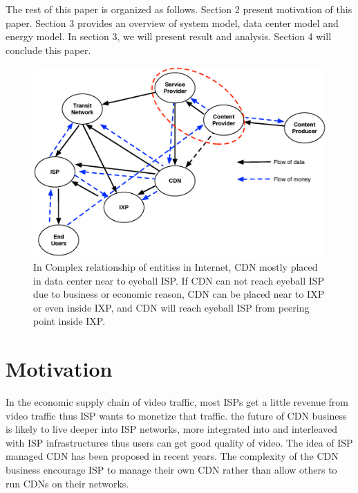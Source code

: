 \documentclass[JIP]{ipsj}
\begin{document}
The rest of this paper is organized as follows. 
Section 2 present motivation of this paper.
Section 3 provides an overview of system model, data center model and energy model.  
In section 3, we will present result and analysis.  
Section 4 will conclude this paper. 

\begin{figure}[tb]
\begin{center}
\includegraphics[scale=0.4]{graphs/business-relationship.eps}
\end{center}
\caption{In Complex relationship of entities in Internet, 
CDN mostly placed in data center near to eyeball ISP. 
If CDN can not reach eyeball ISP due to business or economic reason, CDN can be placed near to IXP or even inside IXP, and CDN will reach eyeball ISP from peering point inside IXP.}
\label{fig:businessrelationship}
\end{figure} 

\section{Motivation}\label{motivation}
In the economic supply chain of video traffic, most ISPs get a little revenue from video traffic thus ISP wants to monetize that traffic.
the future of CDN business is likely to live deeper into ISP networks, more integrated into and interleaved with ISP infrastructures thus users can get good quality of video.
The idea of ISP managed CDN has been proposed in recent years.
The complexity of the CDN business encourage ISP to manage their own CDN rather than allow others to run CDNs on their networks.
\end{document}
